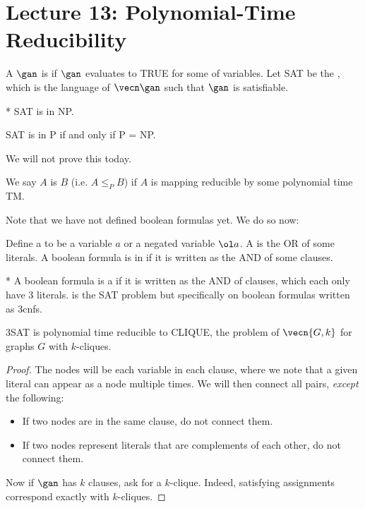 \section*{Lecture 13: Polynomial-Time Reducibility}
\setcounter{section}{13}

\begin{defn}
	A  $\gan$ is  if $\gan$ evaluates to TRUE for some  of variables.
	Let SAT be the , which is the language of $\vecn\gan$ such that $\gan$ is satisfiable.
\end{defn}

\begin{fact}*
	SAT is in NP.
\end{fact}

\begin{thm}
	SAT is in P if and only if P = NP.
\end{thm}

We will not prove this today.

\begin{defn}
	We say $A$ is  $B$ (i.e. $A\leq_P B$) if $A$ is mapping reducible by some polynomial time TM.
\end{defn}

Note that we have not defined boolean formulas yet. We do so now:

\begin{defn}
	Define a  to be a variable $a$ or a negated variable $\ol a$.
	A  is the OR of some literals.
	A boolean formula is in  if it is written as the AND of some clauses.
\end{defn}

\begin{defn}*
	A boolean formula is a  if it is written as the AND of clauses, which each only have 3 literals.  is the SAT problem but specifically on boolean formulas written as 3cnfs.
\end{defn}

\begin{thm}
	3SAT is polynomial time reducible to CLIQUE, the problem of $\vecn{G,k}$ for graphs $G$ with $k$-cliques.
\end{thm}

\begin{proof}
	The nodes will be each variable in each clause, where we note that a given literal can appear as a node multiple times. We will then connect all pairs, \emph{except} the following:
	\begin{itemize}
		\item If two nodes are in the same clause, do not connect them.
		\item If two nodes represent literals that are complements of each other, do not connect them.
	\end{itemize}
	Now if $\gan$ has $k$ clauses, ask for a $k$-clique. Indeed, satisfying assignments correspond exactly with $k$-cliques.
\end{proof}
